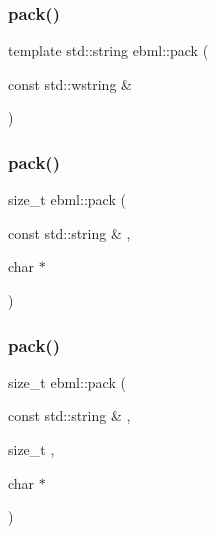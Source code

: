 \mbox{\label{namespaceebml_ab3177fa4c2fceef733358b336d5792db}} 
\subsubsection{\texorpdfstring{pack()}{pack()}\hspace{0.1cm}{\footnotesize\ttfamily [9/18]}}
{\footnotesize\ttfamily template std\+::string ebml\+::pack (\begin{DoxyParamCaption}\item[{const std\+::wstring \&}]{ }\end{DoxyParamCaption})}

\mbox{\label{namespaceebml_a2ee8aa5ba5754b7c9e63da8fce0e413b}} 
\subsubsection{\texorpdfstring{pack()}{pack()}\hspace{0.1cm}{\footnotesize\ttfamily [10/18]}}
{\footnotesize\ttfamily size\+\_\+t ebml\+::pack (\begin{DoxyParamCaption}\item[{const std\+::string \&}]{,  }\item[{char $\ast$}]{ }\end{DoxyParamCaption})}

\mbox{\label{namespaceebml_a436b47856669dd55e115bb9144e4e543}} 
\subsubsection{\texorpdfstring{pack()}{pack()}\hspace{0.1cm}{\footnotesize\ttfamily [11/18]}}
{\footnotesize\ttfamily size\+\_\+t ebml\+::pack (\begin{DoxyParamCaption}\item[{const std\+::string \&}]{,  }\item[{size\+\_\+t}]{,  }\item[{char $\ast$}]{ }\end{DoxyParamCaption})}

\mbox{\label{namespaceebml_a12db4cd27f116243759ded7e321b0a45}} 
